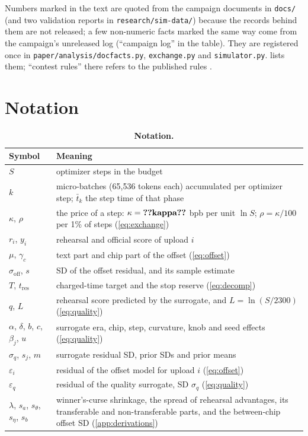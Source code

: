 Numbers marked \docnum{} in the text are quoted from the campaign documents in \texttt{docs/} (and two validation
reports in \texttt{research/sim-data/}) because the records behind them are not released; a few non-numeric facts
marked the same way come from the campaign's unreleased log (``campaign log'' in the table). They are registered once in
\texttt{paper/analysis/docfacts.py}, \texttt{exchange.py} and \texttt{simulator.py}.  lists them;
``contest rules'' there refers to the published rules \citep{trainiumfrontier2026rules}.

{\footnotesize

}

\section{Notation}
\label{app:notation}

\begin{table}[!htbp]
  \centering
  \caption{\textbf{Notation.}}
  \label{tab:notation}
  \small
  \begin{tabular}{@{}lp{12.4cm}@{}}
    \toprule
    Symbol & Meaning \\
    \midrule
    $S$ & optimizer steps in the budget \\
    $k$ & micro-batches (65{,}536 tokens each) accumulated per optimizer step; $\bar t_k$ the step time of that phase \\
    $\kappa$, $\rho$ & the price of a step: $\kappa=\val{kappa}$ bpb per unit $\ln S$; $\rho=\kappa/100$ per 1\% of steps (\cref{eq:exchange}) \\
    $r_i$, $y_i$ & rehearsal and official score of upload $i$ \\
    $\mu$, $\gamma_c$ & text part and chip part of the offset (\cref{eq:offset}) \\
    $\sigma_{\text{off}}$, $s$ & SD of the offset residual, and its sample estimate \\
    $T$, $t_{\text{res}}$ & charged-time target and the stop reserve (\cref{eq:decomp}) \\
    $q$, $L$ & rehearsal score predicted by the surrogate, and $L=\ln(S/2300)$ (\cref{eq:quality}) \\
    $\alpha$, $\delta$, $b$, $c$, $\beta_j$, $u$ & surrogate era, chip, step, curvature, knob and seed effects
      (\cref{eq:quality}) \\
    $\sigma_q$, $s_j$, $m$ & surrogate residual SD, prior SDs and prior means \\
    $\varepsilon_i$ & residual of the offset model for upload $i$ (\cref{eq:offset}) \\
    $\varepsilon_q$ & residual of the quality surrogate, SD $\sigma_q$ (\cref{eq:quality}) \\
    $\lambda$, $s_a$, $s_\theta$, $s_\eta$, $s_b$ & winner's-curse shrinkage, the spread of rehearsal advantages, its
      transferable and non-transferable parts, and the between-chip offset SD (\cref{app:derivations}) \\
    \bottomrule
  \end{tabular}
\end{table}
